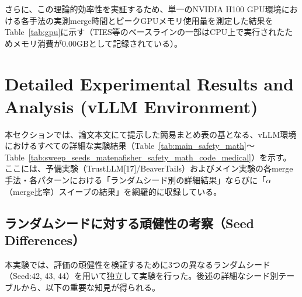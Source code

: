 さらに、この理論的効率性を実証するため、単一のNVIDIA H100 GPU環境における各手法の実測merge時間とピークGPUメモリ使用量を測定した結果をTable~\ref{tab:gpu}に示す（TIES等のベースラインの一部はCPU上で実行されたためメモリ消費が0.00GBとして記録されている）。

\begin{table}[H]
\centering
\caption{各merge手法の実測merge時間とピークGPUメモリ(平均)}
\label{tab:gpu}
\small
{}
\end{table}

\FloatBarrier

\section{Detailed Experimental Results and Analysis (vLLM Environment)}
\label{sec:appendix_detailed_results}

本セクションでは、論文本文にて提示した簡易まとめ表の基となる、vLLM環境におけるすべての詳細な実験結果（Table~\ref{tab:main_safety_math}〜Table~\ref{tab:sweep_seeds_matenafisher_safety_math_code_medical}）を示す。ここには、予備実験（TrustLLM[17]/BeaverTails）およびメイン実験の各merge手法・各パターンにおける「ランダムシード別の詳細結果」ならびに「$\alpha$（merge比率）スイープの結果」を網羅的に収録している。

\subsection{ランダムシードに対する頑健性の考察（Seed Differences）}
本実験では、評価の頑健性を検証するために3つの異なるランダムシード（Seed:42, 43, 44）を用いて独立して実験を行った。後述の詳細なシード別テーブルから、以下の重要な知見が得られる。

